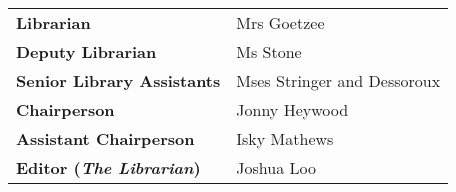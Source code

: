 \begin{tabular}{ p{4cm} p{4.2cm} }
	\textbf{Librarian} & Mrs Goetzee \\
	\textbf{Deputy Librarian} & Ms Stone \\
	\textbf{Senior Library Assistants} & Mses Stringer and Dessoroux \\
	\textbf{Chairperson} & Jonny Heywood \\
	\textbf{Assistant Chairperson} & Isky Mathews \\
	\textbf{Editor (\textit{The Librarian})} & Joshua Loo \\
\end{tabular}